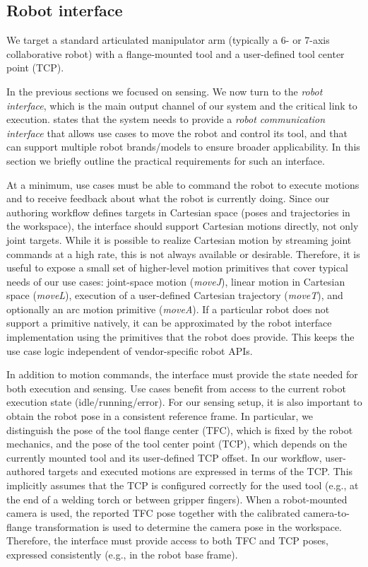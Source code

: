 \subsection{Robot interface} \label{subsec:ch2_analysis_robot_interface}

We target a standard articulated manipulator arm (typically a 6- or 7-axis collaborative robot) with a flange-mounted tool and a user-defined tool center point (TCP).

In the previous sections we focused on sensing. We now turn to the \emph{robot interface}, which is the main output channel of our system and the critical link to execution.  states that the system needs to provide a \emph{robot communication interface} that allows use cases to move the robot and control its tool, and that can support multiple robot brands/models to ensure broader applicability. In this section we briefly outline the practical requirements for such an interface.

At a minimum, use cases must be able to command the robot to execute motions and to receive feedback about what the robot is currently doing. Since our authoring workflow defines targets in Cartesian space (poses and trajectories in the workspace), the interface should support Cartesian motions directly, not only joint targets. While it is possible to realize Cartesian motion by streaming joint commands at a high rate, this is not always available or desirable. Therefore, it is useful to expose a small set of higher-level motion primitives that cover typical needs of our use cases: joint-space motion (\emph{moveJ}), linear motion in Cartesian space (\emph{moveL}), execution of a user-defined Cartesian trajectory (\emph{moveT}), and optionally an arc motion primitive (\emph{moveA}). If a particular robot does not support a primitive natively, it can be approximated by the robot interface implementation using the primitives that the robot does provide. This keeps the use case logic independent of vendor-specific robot APIs.

In addition to motion commands, the interface must provide the state needed for both execution and sensing. Use cases benefit from access to the current robot execution state (idle/running/error). For our sensing setup, it is also important to obtain the robot pose in a consistent reference frame. In particular, we distinguish the pose of the tool flange center (TFC), which is fixed by the robot mechanics, and the pose of the tool center point (TCP), which depends on the currently mounted tool and its user-defined TCP offset. In our workflow, user-authored targets and executed motions are expressed in terms of the TCP. This implicitly assumes that the TCP is configured correctly for the used tool (e.g., at the end of a welding torch or between gripper fingers). When a robot-mounted camera is used, the reported TFC pose together with the calibrated camera-to-flange transformation is used to determine the camera pose in the workspace. Therefore, the interface must provide access to both TFC and TCP poses, expressed consistently (e.g., in the robot base frame).

